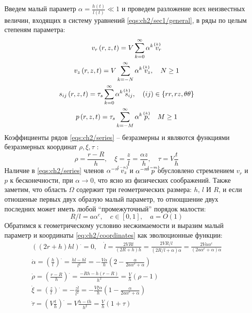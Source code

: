 Введем малый параметр $\alpha = \frac{h(t)}{l(t)} \ll 1$ и проведем разложение всех неизвестных величин, входящих в систему уравнений \cref{eqs:ch2/sec1/general}, в ряды по целым степеням параметра:
\begin{subequations}
  \label{eqs:ch2/series}
  \begin{gather}
    v_{r}\left(r, z, t\right) = V \sum_{k=0}^{\infty}{\alpha^{k} \; \uindex{v}{k}_{r}}
    \\
    v_{z}\left(r, z, t\right) = V \sum_{k=-N}^{\infty}{\alpha^{k} \; \uindex{v}{k}_{z}}, \quad N \ge 1
    \\
    s_{ij}\left(r, z, t\right) = \tau_{s} \sum_{k=0}^{\infty}{\alpha^{k} \; \uindex{s}{k}_{ij}}, \quad (ij)\in\{rr, rz, \theta\theta\}
    \\
    p\left(r, z, t \right) = \tau_{s} \sum_{k=-M}^{\infty}{\alpha^{k} \; \uindex{p}{k}}, \quad M \ge 1
  \end{gather}
\end{subequations}
Коэффициенты рядов \cref{eqs:ch2/series} -- безразмерны и являются функциями безразмерных координат $\rho, \xi, \tau$ :
\begin{equation}
  \label{eq:ch2/coordinates}
  \rho = \frac{r-R}{h}, \quad \xi = \frac{z}{l}=\frac{\alpha z}{h}, \quad \tau = V \frac{t}{h}
\end{equation}
Наличие в \cref{eqs:ch2/series} членов $\alpha^{-n} \; \uindex{v}{-n}_{z}$ и $\alpha^{-m} \; \uindex{p}{-m}$ обусловлено стремлением $v_{r}$ и $p$ к бесконечности, при $\alpha\rightarrow 0$, что ясно из физических соображений. Также заметим, что область $\Omega$ содержит три геометрических размера: $h$, $l$ И $R$, и если отношеные первых двух образую малый параметр, то отнощшение двух последних может иметь любой ``промежуточный'' порядок малости:
\begin{equation}
  \label{eq:ch2/sec1/c}
  R/l = a \alpha^c, \quad c\in[0,1], \quad a=O(1)
\end{equation}
Обратимся к геометрическому условию несжимаемости и выразим малый параметр и координаты \cref{eq:ch2/coordinates} как эволюционные функции:
\begin{subequations}
  \begin{gather}
    \left(\left(2r+h\right)h l\right)^. = 0, \quad \dot{l} = \frac{2 V R l}{\left(2R + h\right)h}=\frac{2 V R/l}{\left(2R/l + \alpha\right)\alpha}=\frac{2 V a \alpha^c}{\left(2a \alpha^c + \alpha\right)\alpha}\nonumber
    \\
    \dot{\alpha} = \left(\frac{h}{l}\right)^. = \frac{\dot{h}l - h\dot{l}}{l^2} = -\frac{V\alpha}{h}\left(2-\frac{\alpha}{2a\alpha^c+\alpha}\right)
    \\
    \dot{\rho} = \left(\frac{r-R}{h}\right)^. = \frac{-\dot{R} h - \dot{h}\left(r-R\right)}{h^2} = \frac{V}{h}\left(\rho-1\right)
    \\
    \dot{\xi} = \left(\frac{z}{l}\right)^. = -\frac{z \dot{l}}{l^2} = -\frac{V\xi\alpha}{h}\left(1-\frac{\alpha}{2a\alpha^c+\alpha}\right)
    \\
    \dot{\tau} = \left(V \frac{t}{h}\right)^. = V \frac{h - t\dot{h}}{h^2} = \frac{V}{h} \left(1+\tau\right)
  \end{gather}
\end{subequations}
